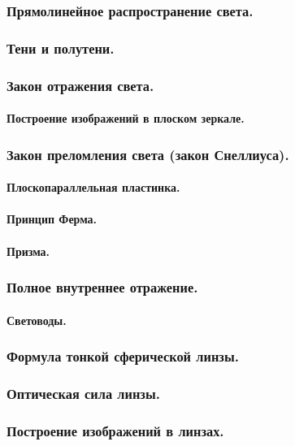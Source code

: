 \documentclass{article}
\begin{document}
        \subsubsection{Прямолинейное распространение света.}
        \subsubsection{Тени и полутени.}
        \subsubsection{Закон отражения света.}
            \paragraph{Построение изображений в плоском зеркале.}
        \subsubsection{Закон преломления света (закон Снеллиуса).}
            \paragraph{Плоскопараллельная пластинка.}
            \paragraph{Принцип Ферма.}
            \paragraph{Призма.}
        \subsubsection{Полное внутреннее отражение.}
            \paragraph{Световоды.}
        \subsubsection{Формула тонкой сферической линзы.}
        \subsubsection{Оптическая сила линзы.}
        \subsubsection{Построение изображений в линзах.}
\end{document}
